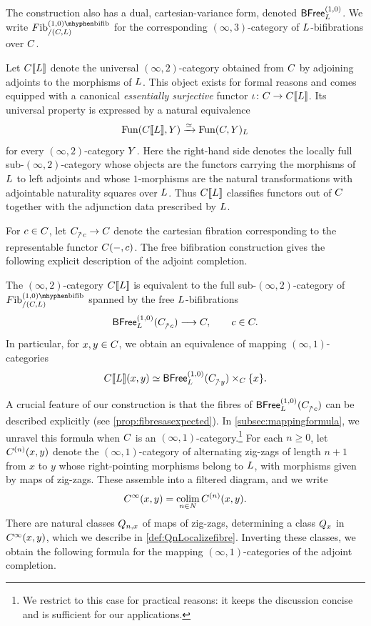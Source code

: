 \documentclass[a4paper,reqno,twoside]{amsart}
\begin{document}
The construction also has a dual, cartesian-variance form, denoted $\mathsf{BFree}^{(1,0)}_{\relax{L}}$. We write $\Fib_{/(\cC,\cL)}^{(1,0)\mhyphen\bifib}$ for the corresponding $(\infty,3)$-category of $\relax{L}$-bifibrations over $\relax{C}$.

Let $\relax{C}[\![\relax{L}]\!]$ denote the universal $(\infty,2)$-category obtained from $\relax{C}$ by adjoining adjoints to the morphisms of $\relax{L}$. This object exists for formal reasons and comes equipped with a canonical \emph{essentially surjective} functor $\iota\colon\relax{C}\to\relax{C}[\![\relax{L}]\!]$. Its universal property is expressed by a natural equivalence
\[
	\mathrm{Fun}(\relax{C}[\![\relax{L}]\!],\relax{Y})
	\xrightarrow{\simeq}
	\mathrm{Fun}(\relax{C},\relax{Y})_{\relax{L}}
\]
for every $(\infty,2)$-category $\relax{Y}$. Here the right-hand side denotes the locally full sub-$(\infty,2)$-category whose objects are the functors carrying the morphisms of $\relax{L}$ to left adjoints and whose $1$-morphisms are the natural transformations with adjointable naturality squares over $\relax{L}$. Thus $\relax{C}[\![\relax{L}]\!]$ classifies functors out of $\relax{C}$ together with the adjunction data prescribed by $\relax{L}$.

For $c\in\relax{C}$, let $\cC_{\upslash c}\to\cC$ denote the cartesian fibration corresponding to the representable functor $\relax{C}(-,c)$. The free bifibration construction gives the following explicit description of the adjoint completion.

\begin{thmint}\label{thm:intro-adjointcompletion}
	The $(\infty,2)$-category $\relax{C}[\![\relax{L}]\!]$ is equivalent to the full sub-$(\infty,2)$-category of $\Fib_{/(\cC,\cL)}^{(1,0)\mhyphen\bifib}$ spanned by the free $\relax{L}$-bifibrations
	\[
		\BFree^{(1,0)}_{\cL}(\cC_{\upslash c})\longrightarrow\cC,
		\qquad c\in\cC.
	\]
	In particular, for $x,y \in \relax{C}$, we obtain an equivalence of mapping $(\infty,1)$-categories
		\[
			\cC\soft{\cL}(x,y)
			\simeq
			\BFree^{(1,0)}_{\cL}(\cC_{\upslash y})\times_{\cC}\{x\}.
		\]
\end{thmint}

A crucial feature of our construction is that the fibres of $\BFree^{(1,0)}_{\cL}(\cC_{\upslash c})$ can be described explicitly (see \cref{prop:fibresasexpected}). In \cref{subsec:mappingformula}, we unravel this formula when $\relax{C}$ is an $(\infty,1)$-category.\footnote{We restrict to this case for practical reasons: it keeps the discussion concise and is sufficient for our applications.} For each $n\geq0$, let $\relax{C}^{(n)}(x,y)$ denote the $(\infty,1)$-category of alternating zig-zags of length $n+1$ from $x$ to $y$ whose right-pointing morphisms belong to $\relax{L}$, with morphisms given by maps of zig-zags. These assemble into a filtered diagram, and we write
\[
	\relax{C}^{\infty}(x,y)=\operatorname*{colim}_{n\in\relax N}\relax{C}^{(n)}(x,y).
\]
There are natural classes $\relax{Q}_{n,x}$ of maps of zig-zags, determining a class $\relax{Q}_x$ in $\relax{C}^{\infty}(x,y)$, which we describe in \cref{def:QnLocalizefibre}. Inverting these classes, we obtain the following formula for the mapping $(\infty,1)$-categories of the adjoint completion.
\end{document}
